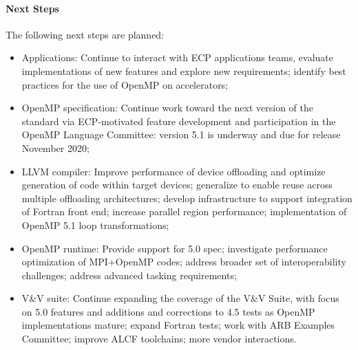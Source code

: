 \paragraph{Next Steps}
The following next steps are planned:
\begin{itemize}
\item Applications: Continue to interact with ECP applications teams, evaluate implementations of new features and explore new requirements; identify best practices for the use of OpenMP on accelerators;

\item OpenMP specification: Continue work toward the next version of the standard via ECP-motivated feature development and participation in the OpenMP Language Committee: version 5.1 is underway and due for release November 2020;

\item LLVM compiler: Improve performance of device offloading and optimize generation of code within target devices; generalize to enable reuse across multiple offloading architectures; develop infrastructure to support integration of Fortran front end; increase parallel region performance; implementation of OpenMP 5.1 loop transformations;

\item  OpenMP runtime: Provide support for 5.0 spec; investigate performance optimization of MPI+OpenMP codes; address broader set of interoperability challenges; address advanced tasking requirements; 

\item V&V suite: Continue expanding the coverage of the V&V Suite, with focus on 5.0 features and additions and corrections to 4.5 tests as OpenMP implementations mature; expand Fortran tests; work with ARB Examples Committee; improve ALCF toolchains; more vendor interactions.
\end{itemize} 




